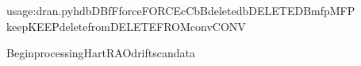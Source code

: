 \documentclass[letterpaper,10pt,english]{sphinxmanual}
\begin{document}
\begin{sphinxVerbatim}[commandchars=\\\{\},numbers=left,firstnumber=1,stepnumber=1]
usage:dran.py\PYG{o}{[}\PYGZhy{}h\PYG{o}{]}\PYG{o}{[}\PYGZhy{}dbDB\PYG{o}{]}\PYG{o}{[}\PYGZhy{}fF\PYG{o}{]}\PYG{o}{[}\PYGZhy{}forceFORCE\PYG{o}{]}\PYG{o}{[}\PYGZhy{}cC\PYG{o}{]}\PYG{o}{[}\PYGZhy{}bB\PYG{o}{]}\PYG{o}{[}\PYGZhy{}delete\PYGZus{}dbDELETE\PYGZus{}DB\PYG{o}{]}\PYG{o}{[}\PYGZhy{}mfpMFP\PYG{o}{]}
\PYG{o}{[}\PYGZhy{}keepKEEP\PYG{o}{]}\PYG{o}{[}\PYGZhy{}delete\PYGZus{}fromDELETE\PYGZus{}FROM\PYG{o}{]}\PYG{o}{[}\PYGZhy{}convCONV\PYG{o}{]}

BeginprocessingHartRAOdriftscandata


\end{sphinxVerbatim}
\end{document}
